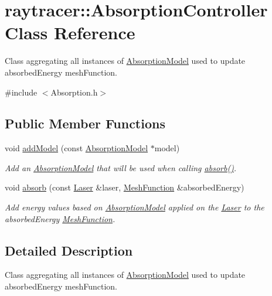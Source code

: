 \hypertarget{classraytracer_1_1AbsorptionController}{}\section{raytracer\+:\+:Absorption\+Controller Class Reference}
\label{classraytracer_1_1AbsorptionController}


Class aggregating all instances of \hyperlink{classraytracer_1_1AbsorptionModel}{Absorption\+Model} used to update absorbed\+Energy mesh\+Function.  




{\ttfamily \#include $<$Absorption.\+h$>$}

\subsection*{Public Member Functions}
\begin{DoxyCompactItemize}
\item 
void \hyperlink{classraytracer_1_1AbsorptionController_a4bde685a4fe1a5adc873e1483d91e2ae}{add\+Model} (const \hyperlink{classraytracer_1_1AbsorptionModel}{Absorption\+Model} $\ast$model)
\begin{DoxyCompactList}\small\item\em Add an \hyperlink{classraytracer_1_1AbsorptionModel}{Absorption\+Model} that will be used when calling \hyperlink{classraytracer_1_1AbsorptionController_a5190d4b54293231350d30f3bf3acc59a}{absorb()}. \end{DoxyCompactList}\item 
void \hyperlink{classraytracer_1_1AbsorptionController_a5190d4b54293231350d30f3bf3acc59a}{absorb} (const \hyperlink{classraytracer_1_1Laser}{Laser} \&laser, \hyperlink{classraytracer_1_1MeshFunction}{Mesh\+Function} \&absorbed\+Energy)
\begin{DoxyCompactList}\small\item\em Add energy values based on \hyperlink{classraytracer_1_1AbsorptionModel}{Absorption\+Model} applied on the \hyperlink{classraytracer_1_1Laser}{Laser} to the absorbed\+Energy \hyperlink{classraytracer_1_1MeshFunction}{Mesh\+Function}. \end{DoxyCompactList}\end{DoxyCompactItemize}


\subsection{Detailed Description}
Class aggregating all instances of \hyperlink{classraytracer_1_1AbsorptionModel}{Absorption\+Model} used to update absorbed\+Energy mesh\+Function. 

